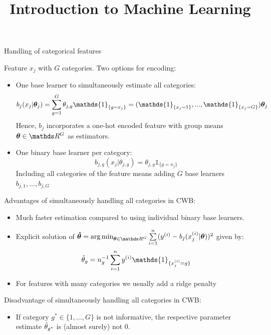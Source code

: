 \documentclass[11pt,compress,t,notes=noshow, xcolor=table]{beamer}
\title{Introduction to Machine Learning}\date{}
\begin{document}


\begin{vbframe}{Handling of categorical features}

Feature $x_j$ with $G$ categories. Two options for encoding:

\begin{itemize}
    \item 
        One base learner to simultaneously estimate all categories: 
        $$b_j(x_j | \thetab_j) = \sum_{g=1}^G \theta_{j,g}\mathds{1}_{\{g = x_j\}} = (\mathds{1}_{\{x_j = 1\}}, ..., \mathds{1}_{\{x_j = G\}}) \thetab_j$$
        Hence, $b_j$ incorporates a one-hot encoded feature with group means $\thetab\in\R^G$ as estimators. 
    
    \item 
        One binary base learner per category:
        $$b_{j,g}(x_j | \theta_{j,g}) = \theta_{j,g}\mathds{1}_{\{g = x_j\}}$$  
        Including all categories of the feature means adding $G$ base learners $b_{j,1}, \dots, b_{j,G}$ %
  \end{itemize}

\framebreak

Advantages of simultaneously handling all categories in CWB: 
\begin{itemize}
    \item 
        Much faster estimation compared to using individual binary base learners.

    \item 
        Explicit solution of $\thetabh = \argmin_{\thetab\in\R^G}\sumin (\yi - b_j(x^{(i)}_j | \thetab))^2$ given by:
        $$
        \thetah_g = n_g^{-1}\sumin \yi \mathds{1}_{\{x^{(i)}_j = g\}}
        $$

    \item 
        For features with many categories we usually add a ridge penalty
\end{itemize}

Disadvantage of simultaneously handling all categories in CWB: 
\begin{itemize}
    \item 
        If category $g^\ast\in\{1, \dots, G\}$ is not informative, the respective parameter estimate $\hat{\theta}_{g^\ast}$ is (almost surely) not $0$.
\end{itemize}


\end{vbframe}
\end{document}
